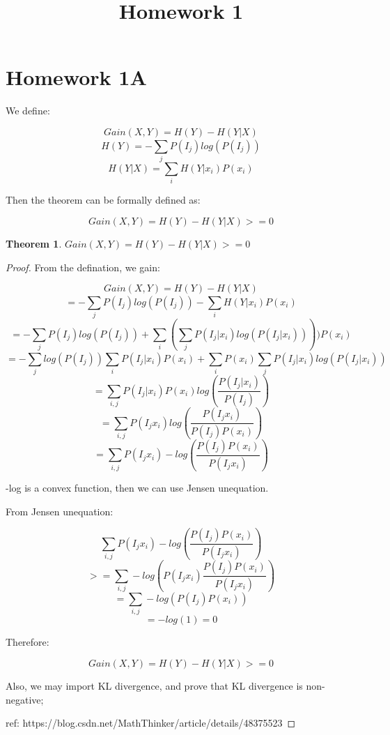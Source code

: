 \documentclass{article} %
\title{Homework 1}
\newtheorem{theorem}{Theorem}
\newtheorem{proof}{Proof}
\begin{document}
\maketitle
%


\section{Homework 1A}







    

We define:

$$Gain(X,Y)=H(Y)-H(Y|X)$$
$$H(Y)=-\sum_{j}^{}P(I_j)log(P(I_j))$$
$$H(Y|X)=\sum_{i}H(Y|x_i)P(x_i)$$

Then the theorem can be formally defined as:

$$Gain(X,Y)=H(Y)-H(Y|X)>=0$$

\begin{theorem}

    $Gain(X,Y)=H(Y)-H(Y|X)>=0$

\end{theorem}

\begin{proof}


From the defination, we gain:

$$Gain(X,Y)=H(Y)-H(Y|X)$$
$$=-\sum_{j}^{}P(I_j)log(P(I_j))-\sum_{i}H(Y|x_i)P(x_i)$$
$$=-\sum_{j}^{}P(I_j)log(P(I_j))+\sum_{i}(\sum_{j}^{}P(I_j|x_i)log(P(I_j|x_i))))P(x_i)$$
$$=-\sum_{j}^{}log(P(I_j))\sum_{i}P(I_j|x_i)P(x_i)+\sum_{i}P(x_i)\sum_{j}^{}P(I_j|x_i)log(P(I_j|x_i))$$
$$=\sum_{i,j}P(I_j|x_i)P(x_i)log(\frac{P(I_j|x_i)}{P(I_j)})$$
$$=\sum_{i,j}P(I_jx_i)log(\frac{P(I_jx_i)}{P(I_j)P(x_i)})$$
$$=\sum_{i,j}P(I_jx_i)-log(\frac{P(I_j)P(x_i)}{P(I_jx_i)})$$

-log is a convex function, then we can use Jensen unequation.

From Jensen unequation:

$$\sum_{i,j}P(I_jx_i)-log(\frac{P(I_j)P(x_i)}{P(I_jx_i)})$$
$$>=\sum_{i,j}-log(P(I_jx_i)\frac{P(I_j)P(x_i)}{P(I_jx_i)})$$
$$=\sum_{i,j}-log(P(I_j)P(x_i))$$
$$=-log(1)=0$$

Therefore:

$$Gain(X,Y)=H(Y)-H(Y|X)>=0$$

Also, we may import KL divergence, and prove that KL divergence is non-negative;


ref: https://blog.csdn.net/MathThinker/article/details/48375523

\end{proof}


\end{document}

